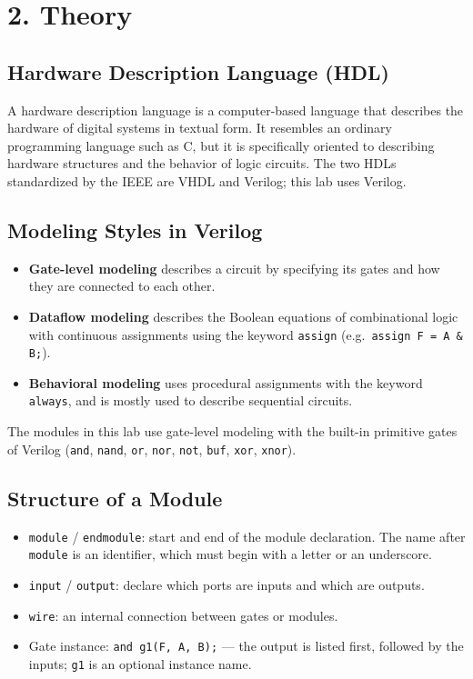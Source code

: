 \section*{2. Theory}

\subsection*{Hardware Description Language (HDL)}
A hardware description language is a computer-based language that describes the hardware of digital systems in textual form. It resembles an ordinary programming language such as C, but it is specifically oriented to describing hardware structures and the behavior of logic circuits. The two HDLs standardized by the IEEE are VHDL and Verilog; this lab uses Verilog.

\subsection*{Modeling Styles in Verilog}
\begin{itemize}[leftmargin=*]
    \item \textbf{Gate-level modeling} describes a circuit by specifying its gates and how they are connected to each other.
    \item \textbf{Dataflow modeling} describes the Boolean equations of combinational logic with continuous assignments using the keyword \texttt{assign} (e.g.\ \texttt{assign F = A \& B;}).
    \item \textbf{Behavioral modeling} uses procedural assignments with the keyword \texttt{always}, and is mostly used to describe sequential circuits.
\end{itemize}
The modules in this lab use gate-level modeling with the built-in primitive gates of Verilog (\texttt{and}, \texttt{nand}, \texttt{or}, \texttt{nor}, \texttt{not}, \texttt{buf}, \texttt{xor}, \texttt{xnor}).

\subsection*{Structure of a Module}
\begin{itemize}[leftmargin=*]
    \item \texttt{module} / \texttt{endmodule}: start and end of the module declaration. The name after \texttt{module} is an identifier, which must begin with a letter or an underscore.
    \item \texttt{input} / \texttt{output}: declare which ports are inputs and which are outputs.
    \item \texttt{wire}: an internal connection between gates or modules.
    \item Gate instance: \texttt{and g1(F, A, B);} --- the output is listed first, followed by the inputs; \texttt{g1} is an optional instance name.
\end{itemize}

